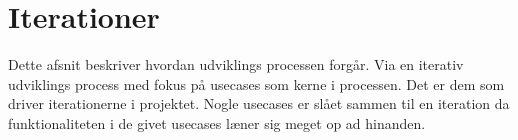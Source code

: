 \chapter{Iterationer}
Dette afsnit beskriver hvordan udviklings processen forgår. Via en iterativ udviklings process med fokus på usecases som kerne i processen. Det er dem som driver iterationerne i projektet. Nogle usecases er slået sammen til en iteration da funktionaliteten i de givet usecases læner sig meget op ad hinanden. 




